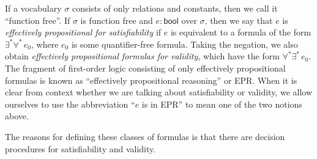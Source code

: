 %
If a vocabulary $\sigma$ consists of only relations and constants,
  then we call it ``function free''.
If $\sigma$ is function free and $e : \mathsf{bool}$ over $\sigma$,
  then we say that $e$ is \emph{effectively propositional for satisfiability}
  if $e$ is equivalent to a formula of the form $\exists^*\forall^*\, e_0$,
  where $e_0$ is some quantifier-free formula.
Taking the negation, we also obtain \emph{effectively propositional formulas for validity},
  which have the form $\forall^*\exists^*\, e_0$.
The fragment of first-order logic consisting of only effectively propositional formulas
  is known as ``effectively propositional reasoning'' or EPR.
When it is clear from context whether we are talking about satisfiability or validity,
  we allow ourselves to use the abbreviation ``$e$ is in EPR'' to mean one of the two notions above.

The reasons for defining these classes of formulas is that there are
  decision procedures for satisfiability and validity.

